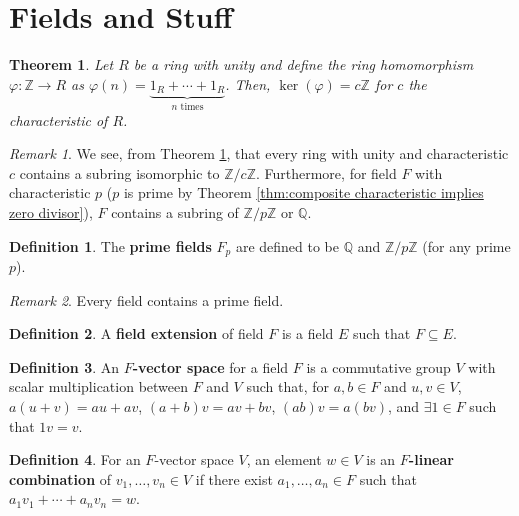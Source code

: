 \documentclass[
    parskip=half,
    toc=flat,
    toc=sectionentrydotfill,
]{scrartcl}  %
\theoremstyle{definition}
\newtheorem{definition}{Definition}[section]
\theoremstyle{plain}
\newtheorem{theorem}{Theorem}[definition]
\theoremstyle{remark}
\newtheorem{remark}{Remark}[definition]
\begin{document}
\section{Fields and Stuff}

\begin{theorem}
    \label{thm:characteristic ring homomorphism}
    Let $R$ be a ring with unity and define the ring homomorphism $\varphi:\mathbb{Z}\to R$ as
    $\varphi(n)=\underbrace{1_R+\cdots+1_R}_{n\text{ times}}$.
    Then, $\ker(\varphi)=c\mathbb{Z}$ for $c$ the characteristic of $R$.
\end{theorem}

\begin{remark}
    We see, from Theorem \ref{thm:characteristic ring homomorphism}, that every ring with unity and
    characteristic $c$ contains a subring isomorphic to $\mathbb{Z}/c\mathbb{Z}$.
    Furthermore, for field $F$ with characteristic $p$ ($p$ is prime by Theorem
    \ref{thm:composite characteristic implies zero divisor}), $F$ contains a subring of
    $\mathbb{Z}/p\mathbb{Z}$ or $\mathbb{Q}$.
\end{remark}

\begin{definition}
    The \textbf{prime fields} $F_p$ are defined to be $\mathbb{Q}$ and $\mathbb{Z}/p\mathbb{Z}$
    (for any prime $p$).
\end{definition}

\begin{remark}
    Every field contains a prime field.
\end{remark}

\begin{definition}
    A \textbf{field extension} of field $F$ is a field $E$ such that $F\subseteq E$.
\end{definition}

\begin{definition}
    An \textbf{$F$-vector space} for a field $F$ is a commutative group $V$ with scalar
    multiplication between $F$ and $V$ such that, for $a,b\in F$ and $u,v\in V$, $a(u+v)=au+av$,
    $(a+b)v=av+bv$, $(ab)v=a(bv)$, and $\exists 1\in F$ such that $1v=v$.
\end{definition}

\begin{definition}
    For an $F$-vector space $V$, an element $w\in V$ is an \textbf{$F$-linear combination} of
    $v_1,\dots,v_n\in V$ if there exist $a_1,\dots,a_n\in F$ such that
    $a_1v_1+\cdots+a_nv_n=w$.
\end{definition}
\end{document}
